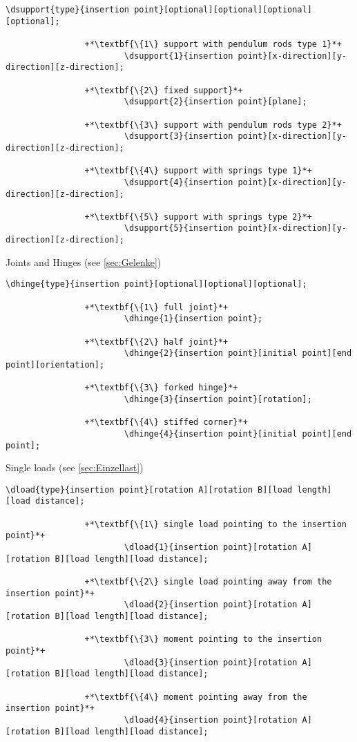 \documentclass[%
  a4paper,
  BCOR20mm,
  pointlessnumbers,
  twoside,
  halfparskip,
  openright,
]{scrreprt}
\begin{document}
\begin{lstlisting}[emph={dsupport},backgroundcolor=\color{white}]
		\dsupport{type}{insertion point}[optional][optional][optional][optional];
		
				+*\textbf{\{1\} support with pendulum rods type 1}*+
						\dsupport{1}{insertion point}[x-direction][y-direction][z-direction];
						
				+*\textbf{\{2\} fixed support}*+
						\dsupport{2}{insertion point}[plane];
						
				+*\textbf{\{3\} support with pendulum rods type 2}*+
						\dsupport{3}{insertion point}[x-direction][y-direction][z-direction];
						
				+*\textbf{\{4\} support with springs type 1}*+
						\dsupport{4}{insertion point}[x-direction][y-direction][z-direction];
		
				+*\textbf{\{5\} support with springs type 2}*+
						\dsupport{5}{insertion point}[x-direction][y-direction][z-direction];
\end{lstlisting}\vspace{-10mm}

Joints and Hinges (see \ref{sec:Gelenke})

\begin{lstlisting}[emph={dhinge},backgroundcolor=\color{white}]
		\dhinge{type}{insertion point}[optional][optional][optional];
		
				+*\textbf{\{1\} full joint}*+
						\dhinge{1}{insertion point};
						
				+*\textbf{\{2\} half joint}*+
						\dhinge{2}{insertion point}[initial point][end point][orientation];
						
				+*\textbf{\{3\} forked hinge}*+
						\dhinge{3}{insertion point}[rotation];
		
				+*\textbf{\{4\} stiffed corner}*+
						\dhinge{4}{insertion point}[initial point][end point];								
\end{lstlisting}\vspace{-10mm}

Single loads (see \ref{sec:Einzellast})

\begin{lstlisting}[emph={dload},backgroundcolor=\color{white}]
		\dload{type}{insertion point}[rotation A][rotation B][load length][load distance];
		
				+*\textbf{\{1\} single load pointing to the insertion point}*+
						\dload{1}{insertion point}[rotation A][rotation B][load length][load distance];
						
				+*\textbf{\{2\} single load pointing away from the insertion point}*+
						\dload{2}{insertion point}[rotation A][rotation B][load length][load distance];
						
				+*\textbf{\{3\} moment pointing to the insertion point}*+
						\dload{3}{insertion point}[rotation A][rotation B][load length][load distance];
						
				+*\textbf{\{4\} moment pointing away from the insertion point}*+
						\dload{4}{insertion point}[rotation A][rotation B][load length][load distance];
\end{lstlisting}\vspace{-10mm}
\end{document}
